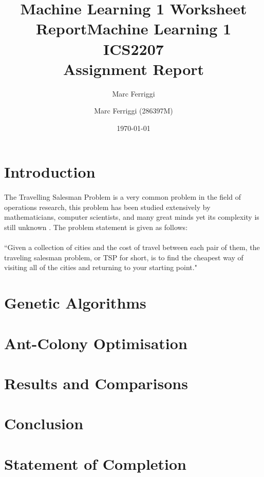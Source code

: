 \documentclass[11pt,a4paper,final]{article}
\author{Marc Ferriggi}
\title{Machine Learning 1 Worksheet Report}
\begin{document}
	\title{Machine Learning 1 \\
	\large ICS2207 \\ Assignment Report}
	\author{Marc Ferriggi (286397M)}
	\date{\today}
	\maketitle
	\tableofcontents
	
	\section{Introduction}
	\label{Intro}
	\paragraph{} The Travelling Salesman Problem is a very common problem in the field of operations research, this problem has been studied extensively by mathematicians, computer scientists, and many great minds yet its complexity is still unknown \cite{TSP}. The problem statement is given as follows:\\
	\hspace{0pt}\\
	``Given a collection of cities and the cost of travel between each pair of them, the traveling salesman problem, or TSP for short, is to find the cheapest way of visiting all of the cities and returning to your starting point." \cite{TSP}\\
	\par 
	\section{Genetic Algorithms}
	\label{GAs}
	
	\section{Ant-Colony Optimisation}
	\label{ACO}
	
	\section{Results and Comparisons}
	\label{Results}
	
	\section{Conclusion}
	\label{Conc}
	
	\section{Statement of Completion}
	\label{SoC}
	
\end{document}
